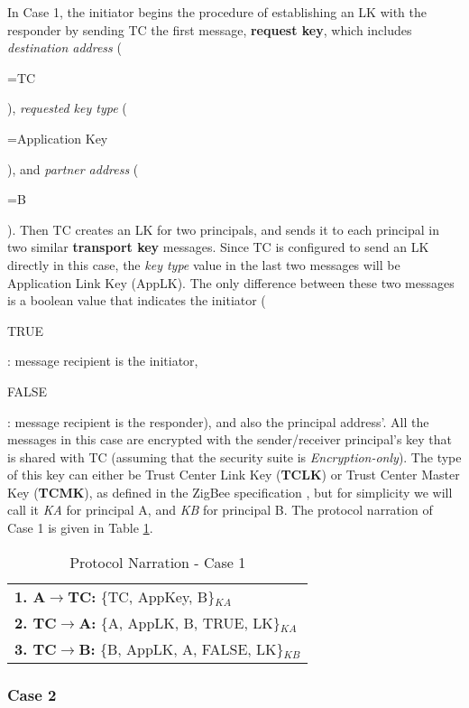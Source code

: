 In Case 1, the initiator begins the procedure of establishing an LK with the responder by sending TC the first message, \textbf{request key},
which includes \emph{destination address} (\begin{footnotesize}=TC\end{footnotesize}), \emph{requested key type} (\begin{footnotesize}=Application Key\end{footnotesize}), and \emph{partner address} (\begin{footnotesize}=B\end{footnotesize}). 
Then TC creates an LK for two principals, and sends it to each principal in two similar \textbf{transport key} messages. 
Since TC is configured to send an LK directly in this case, the \emph{key type} value in the last two messages will be Application Link Key (AppLK). 
The only difference between these two messages is a boolean value that indicates the initiator 
(\begin{footnotesize}TRUE\end{footnotesize}: message recipient is the initiator, \begin{footnotesize}FALSE\end{footnotesize}: message recipient is the responder), and also the principal address'. 
All the messages in this case are encrypted with the sender/receiver principal's key that is shared with TC (assuming that the security suite is \emph{Encryption-only}). 
The type of this key can either be Trust Center Link Key (\textbf{TCLK}) or Trust Center Master Key (\textbf{TCMK}), as defined in the ZigBee specification \cite{ZigBee:2007}, 
but for simplicity we will call it \emph{KA} for principal A, and \emph{KB} for principal B.
The protocol narration of Case 1 is given in Table \ref{tab:protocolnarration1}.

\begin{table}\caption{Protocol Narration - Case 1}
\label{tab:protocolnarration1}
\centering
\begin{tabular}{l}  
\hline
\textbf{1. A\(\rightarrow\)TC:} \{TC, AppKey, B\}$_{KA}$   \\
\textbf{2. TC\(\rightarrow\)A:} \{A, AppLK, B, TRUE, LK\}$_{KA}$  \\
\textbf{3. TC\(\rightarrow\)B:} \{B, AppLK, A, FALSE, LK\}$_{KB}$  \\
\hline
\end{tabular}
\end{table}

\subsubsection{Case 2}

